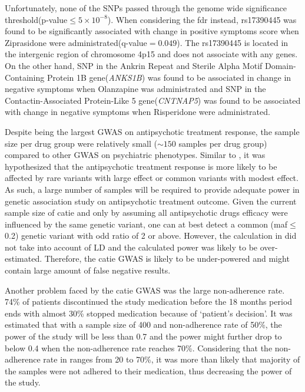 	Unfortunately, none of the \glspl{SNP} passed through the genome wide significance threshold(p-value$\le5\times10^{-8}$).
	When considering the \gls{fdr} instead, rs17390445 was found to be significantly associated with change in positive symptoms score when Ziprasidone were administrated(q-value$=0.049$).
	The rs17390445 is located in the intergenic region of chromosome 4p15 and does not associate with any genes. 
	On the other hand, \gls{SNP} in the Ankrin Repeat and Sterile Alpha Motif Domain-Containing Protein 1B gene(\textit{ANKS1B}) was found to be associated in change in negative symptoms when Olanzapine was administrated and \gls{SNP} in the Contactin-Associated Protein-Like 5 gene(\textit{CNTNAP5}) was found to be associated with change in negative symptoms when Risperidone were administrated.

	Despite being the largest \gls{GWAS} on antipsychotic treatment response, the sample size per drug group were relatively small ($\sim150$ samples per drug group) compared to other \gls{GWAS} on psychiatric phenotypes.
	Similar to , it was hypothesized that the antipsychotic treatment response is more likely to be affected by rare variants with large effect or common variants with modest effect\citep{Jorgensen2008}. 
	As such, a large number of samples will be required to provide adequate power in genetic association study on antipsychotic treatment outcome.
	Given the current sample size of \gls{catie} and only by assuming all antipsychotic drugs efficacy were influenced by the same genetic variant, one can at best detect a common (\gls{maf}$\le$ 0.2) genetic variant with odd ratio of 2 or above\citep{Jorgensen2008}.	
	However, the calculation in \citet{Jorgensen2008} did not take into account of \gls{LD} and the calculated power was likely to be over-estimated.
	Therefore, the \gls{catie} \gls{GWAS} is likely to be under-powered and might contain large amount of false negative results.
	
	Another problem faced by the \gls{catie} \gls{GWAS} was the large non-adherence rate. 
	74\% of patients discontinued the study medication before the 18 months period ends\citep{Lieberman2005} with almost 30\% stopped medication because of `patient's decision'.
	It was estimated that with a sample size of 400 and non-adherence rate of 50\%, the power of the study will be less than 0.7 and the power might further drop to below 0.4 when the non-adherence rate reaches 70\%\citep{Malhotra2012}.
	Considering that the non-adherence rate in  ranges from 20 to 70\%\citep{Malhotra2012}, it was more than likely that majority of the samples were not adhered to their medication, thus decreasing the power of the study.
	
